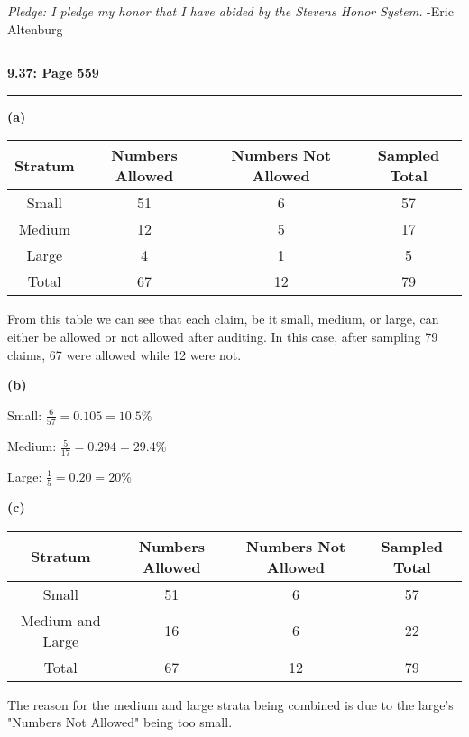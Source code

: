 \documentclass[11pt]{article}
\newcommand\question[2]{\vspace{.25in}\hrule\textbf{#1: #2}\vspace{.5em}\hrule\vspace{.10in}}
\renewcommand\part[1]{\vspace{.10in}\textbf{(#1)}\par}
\begin{document}
\raggedright
\newcommand\NAME{Eric Altenburg}  %
\newcommand\COURSE{MA-331}
\newcommand\HWNUM{5}              %


\textit{Pledge: I pledge my honor that I have abided by the Stevens Honor System.} -Eric Altenburg

\question{9.37}{Page 559}

	\part{a}
		\begin{tabular}{|c|c|c|c|}
			\hline
			Stratum & Numbers Allowed & Numbers Not Allowed & Sampled Total\\
			\hline
			Small & 51 & 6 & 57\\
			\hline
			Medium & 12 & 5 & 17\\
			\hline
			Large & 4 & 1 & 5\\
			\hline
			Total & 67 & 12 & 79\\
			\hline
		\end{tabular}\par
		From this table we can see that each claim, be it small, medium, or large, can either be allowed or not allowed after auditing. In this case, after sampling 79 claims, 67 were allowed while 12 were not.\par
		
	\part{b}
		Small: $\frac{6}{57}=0.105 = 10.5\%$\par
		Medium: $\frac{5}{17}=0.294=29.4\%$\par
		Large: $\frac{1}{5} = 0.20 = 20\%$ \par
		
	\part{c}
		\begin{tabular}{|c|c|c|c|}
			\hline
			Stratum & Numbers Allowed & Numbers Not Allowed & Sampled Total\\
			\hline
			Small & 51 & 6 & 57\\
			\hline
			Medium and Large & 16 & 6 & 22\\
			\hline
			Total & 67 & 12 & 79\\
			\hline
		\end{tabular}\par
		The reason for the medium and large strata being combined is due to the large's "Numbers Not Allowed" being too small.\par
		
\end{document}
